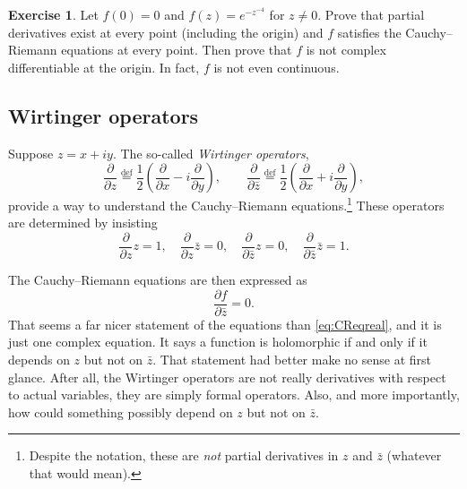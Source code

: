 \documentclass[12pt,openany]{book}
\newcommand{\myindex}[1]{#1\index{#1}}
\theoremstyle{plain}
\theoremstyle{remark}
\theoremstyle{definition}
\newenvironment{exbox}{%
    \def\FrameCommand{\vrule width 1pt \relax\hspace{10pt}}%
    \MakeFramed{\advance\hsize-\width\FrameRestore}%
}{%
    \endMakeFramed
}
\theoremstyle{exercise}
\newtheorem{exercise}{Exercise}[section]
\theoremstyle{example}
\begin{document}
\begin{exbox}
\begin{exercise}
Let $f(0) = 0$ and $f(z) = e^{-z^{-4}}$ for $z \not=0$.  Prove that partial
derivatives exist at every point (including the origin) and $f$
satisfies the Cauchy--Riemann equations at every point.
Then prove
that $f$ is not complex differentiable at the origin.  In fact, $f$ is not
even continuous.
\end{exercise}
\end{exbox}


\subsection{Wirtinger operators}

Suppose $z=x+iy$.
The so-called \emph{\myindex{Wirtinger operators}},
\begin{equation*}
\frac{\partial}{\partial z}
\overset{\text{def}}{=}
\frac{1}{2}
\left(
\frac{\partial}{\partial x} - i
\frac{\partial}{\partial y}
\right),
\qquad
\frac{\partial}{\partial \bar{z}}
\overset{\text{def}}{=}
\frac{1}{2}
\left(
\frac{\partial}{\partial x} + i
\frac{\partial}{\partial y}
\right)
,
\end{equation*}
provide a way to understand the
Cauchy--Riemann equations.\footnote{Despite the notation, these are
\emph{not} partial derivatives in $z$ and $\bar{z}$
(whatever that would mean).}
These operators are determined by insisting
%
\begin{equation*}
\frac{\partial}{\partial z} z = 1, \quad
\frac{\partial}{\partial z} \bar{z} = 0, \quad
\frac{\partial}{\partial \bar{z}} z = 0, \quad
\frac{\partial}{\partial \bar{z}} \bar{z} = 1.
\end{equation*}

The Cauchy--Riemann equations are then expressed as
\begin{equation} \label{eq:CReq}
\frac{\partial f}{\partial \bar{z}} = 0 .
\end{equation}
That seems a far nicer statement of the equations than \eqref{eq:CReqreal},
and it is just one complex equation.  
It says
a function is holomorphic if and only if it depends on $z$ but not on
$\bar{z}$.  That statement had better make no sense at first glance.
After all, the Wirtinger operators are not really derivatives with
respect to actual variables,
they are simply formal operators.
Also, and more importantly,
how could something possibly depend on $z$ but not on $\bar{z}$.
\end{document}
